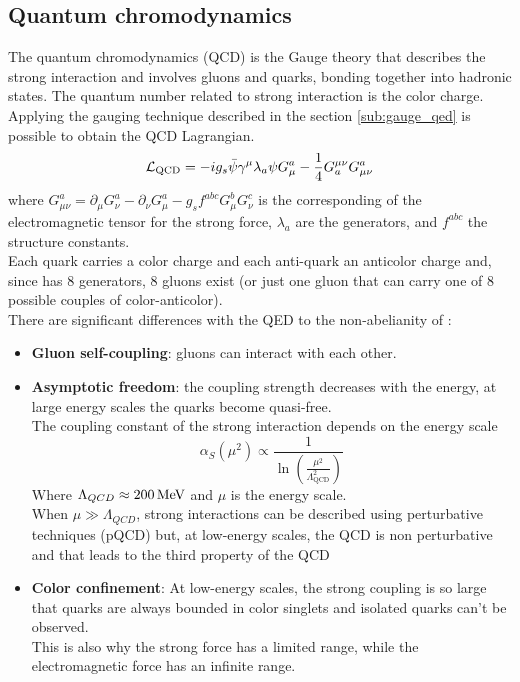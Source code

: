 \subsection{Quantum chromodynamics}\label{sub:QCD}
The quantum chromodynamics (QCD) is the  Gauge theory that describes the strong interaction and involves gluons and quarks, bonding together into hadronic states.
The quantum number related to strong interaction is the color charge.
Applying the gauging technique described in the section \ref{sub:gauge_qed} is possible to obtain the QCD Lagrangian.
\begin{equation}\label{eq:QCD}
    \mathcal{L}_\text{QCD}=-i g_{s}\bar{\psi}\gamma^{\mu}\lambda_{a}\psi G_{\mu}^a-\frac{1}{4}G_{a}^{\mu\nu}G_{\mu\nu}^a
\end{equation}
where \(G_{\mu\nu}^{a}=\partial_{\mu}G_{\nu}^{a}-\partial_{\nu}G_{\mu}^{a}-g_{s}f^{a b c}G_{\mu}^{b}G_{\nu}^{c}\) is the corresponding of the electromagnetic tensor for the strong force, $\lambda_a$ are the  generators, and $f^{abc}$ the  structure constants.\\
Each quark carries a color charge and each anti-quark an anticolor charge and, since  has 8 generators, 8 gluons exist (or just one gluon that can carry one of 8 possible couples of color-anticolor).\\
There are significant differences with the QED to the non-abelianity of :
\begin{itemize}
    \item \textbf{Gluon self-coupling}: gluons can interact with each other.
    \item \textbf{Asymptotic freedom}: the coupling strength decreases with the energy, \ie at large energy scales the quarks become quasi-free.\\
    The coupling constant of the strong interaction depends on the energy scale \cite{Deur2016TheCoupling}
    \begin{equation}\label{eq:alphas_run}
        \alpha_S(\mu^2)\propto \frac{1}{\ln \left( \frac{\mu^2}{\Lambda_{\text{QCD}}^2}\right)}        
    \end{equation}
    Where $\Lambda_{QCD}\approx 200 {\,\text{Me\hspace{-.08em}V}}$ and $\mu$ is the energy scale.\\
    When $\mu \gg \Lambda_{QCD}$, strong interactions can be described using perturbative techniques (pQCD) but, at low-energy scales, the QCD is non perturbative and that leads to the third property of the QCD
    \item \textbf{Color confinement}: At low-energy scales, the strong coupling is so large that quarks are always bounded in color singlets and isolated quarks can't be observed.\\
    This is also why the strong force has a limited range, while the electromagnetic force has an infinite range.
\end{itemize}

